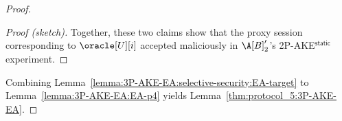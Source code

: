 \begin{proof}
\begin{proof}[Proof (sketch)]
Together,
these two claims show that the proxy session corresponding to $\oracle[U][i]$ accepted maliciously in $\A[B]'_2$'s 2P-AKE$^\mathsf{static}$ experiment. 
\end{proof}

Combining Lemma~\ref{lemma:3P-AKE-EA:selective-security:EA-target} to Lemma~\ref{lemma:3P-AKE-EA:EA-p4} yields Lemma~\ref{thm:protocol_5:3P-AKE-EA}.
\end{proof} %